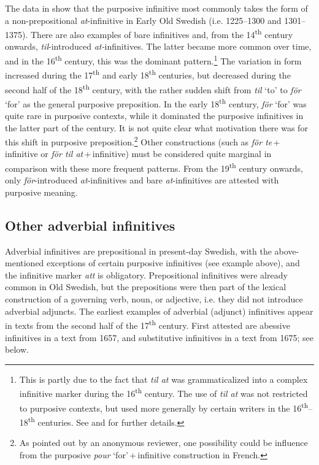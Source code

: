 \documentclass[output=paper]{langscibook}
\begin{document}
The data in  show that the purposive infinitive most commonly takes the form of a non-prepositional \textit{at}{}-infinitive in Early Old Swedish (i.e. 1225–1300 and 1301–1375). There are also examples of bare infinitives and, from the 14\textsuperscript{th} century onwards, \textit{til}{}-introduced \textit{at-}infinitives. The latter became more common over time, and in the 16\textsuperscript{th} century, this was the dominant pattern.\footnote{This is partly due to the fact that \textit{til at} was grammaticalized into a complex infinitive marker during the 16\textsuperscript{th} century. The use of \textit{til at} was not restricted to purposive contexts, but used more generally by certain writers in the 16\textsuperscript{th}–18\textsuperscript{th} centuries. See \citet{Kalm2016Prepositioner} and \citet[203–221]{Kalm2016Satsekvivalenta} for further details.} The variation in form increased during the 17\textsuperscript{th} and early 18\textsuperscript{th} centuries, but decreased during the second half of the 18\textsuperscript{th} century, with the rather sudden shift from \textit{til} ‘to’ to \textit{för} ‘for’ as the general purposive preposition. In the early 18\textsuperscript{th} century, \textit{för} ‘for’ was quite rare in purposive contexts, while it dominated the purposive infinitives in the latter part of the century. It is not quite clear what motivation there was for this shift in purposive preposition.\footnote{As pointed out by an anonymous reviewer, one possibility could be influence from the purposive \textit{pour} ‘for’\,+\,infinitive construction in French.}  Other constructions (such as \textit{för te}\,+\,infinitive or \textit{för til at}\,+\,infinitive) must be considered quite marginal in comparison with these more frequent patterns. From the 19\textsuperscript{th} century onwards, only \textit{för}{}-introduced \textit{at}{}-infinitives and bare \textit{at}{}-infinitives are attested with purposive meaning. 


\subsection{Other adverbial infinitives}\label{sec:kalm:4.2}

Adverbial infinitives are prepositional in present-day Swedish, with the above-mentioned exceptions of certain purposive infinitives (see example  above), and the infinitive marker \textit{att} is obligatory. Prepositional infinitives were already common in Old Swedish, but the prepositions were then part of the lexical construction of a governing verb, noun, or adjective, i.e. they did not introduce adverbial adjuncts. The earliest examples of adverbial (adjunct) infinitives appear in texts from the second half of the 17\textsuperscript{th} century. First attested are abessive infinitives in a text from 1657, and substitutive infinitives in a text from 1675; see  below. 
\end{document}
